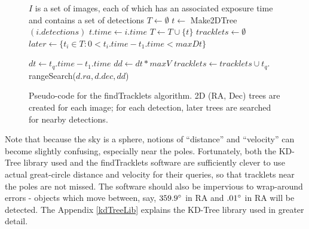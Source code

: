 \begin{figure}[ht]
\begin{algorithmic}
\REQUIRE $I$ is a set of images, each of which has an associated exposure time and contains a set of detections
\STATE {}
\STATE $T \gets \emptyset$
  \STATE $t \gets$ Make2DTree$(i.detections)$
  \STATE $t.time \gets i.time$
  \STATE $T \gets T \cup \{t\}$
\ENDFOR
\STATE {}
\STATE $tracklets \gets \emptyset$
  \STATE $later \gets \{t_i \in T : 0 < t_i.time - t_1.time < maxDt\}$
 
       \STATE {}

        \STATE $dt \gets t_q.time - t_1.time$
        \STATE $dd \gets dt * maxV$
        \STATE {}
        \STATE $tracklets \gets tracklets \cup t_q.$rangeSearch($d.ra, d.dec, dd$)
     \ENDFOR
   \ENDFOR
\ENDFOR
{}
\end{algorithmic}

\caption{Pseudo-code for the findTracklets algorithm.  2D (RA, Dec)
  trees are created for each image; for each detection, later trees
  are searched for nearby detections. }
 \label{findTrackletsAlgorithm}
\end{figure}


Note that because the sky is a sphere, notions of ``distance'' and
``velocity'' can become slightly confusing, especially near the poles.
Fortunately, both the KD-Tree library used and the findTracklets
software are sufficiently clever to use actual great-circle distance
and velocity for their queries, so that tracklets near the poles are
not missed.  The software should also be impervious to wrap-around
errors - objects which move between, say, $359.9 \degree$ in RA and
$.01 \degree$ in RA will be detected.  The Appendix \ref{kdTreeLib}
explains the KD-Tree library used in greater detail.  









